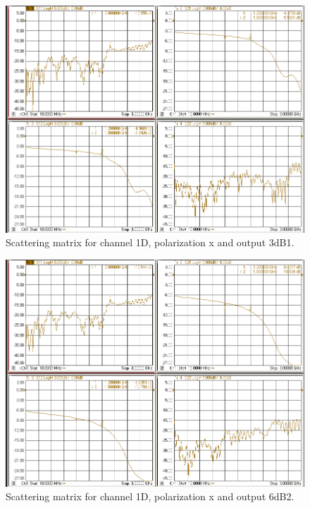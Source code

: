 \documentclass[12pt,a4paper,oneside]{article}
\begin{document}
\begin{figure}[H]
\centering
\includegraphics[width=0.9\linewidth]{VNA_results/1Dx_3dB1.png}
\caption{Scattering matrix for channel 1D, polarization x and output 3dB1.}
\label{fig:1Dx_3dB1}
\end{figure}


\begin{figure}[H]
\centering
\includegraphics[width=0.9\linewidth]{VNA_results/1Dx_6dB2.png}
\caption{Scattering matrix for channel 1D, polarization x and output 6dB2.}
\label{fig:1Dx_6dB2}
\end{figure}
\end{document}

